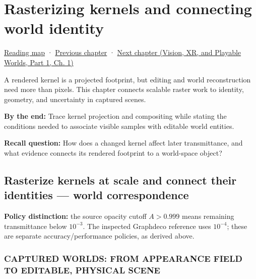 \chapter{Rasterizing kernels and connecting world identity}\label{06-engine-ii-ch045-rasterizing-kernels-and-connecting-world-identity}\hypertarget{06-engine-ii-ch045}{}\label{stagechapter:06-engine-ii-ch045}

\hypertarget{06-engine-ii-ch045-rasterizing-kernels-and-connecting-world-identity}{}

\hyperref[volume-reading-map]{Reading map} · \hyperref[06-engine-ii-ch044-cross-backend-conversion-and-agreement]{Previous chapter} · \href{../07-Vision-XR-and-Playable-Worlds-P01/main.pdf\#02-foundations-ii-ch039}{Next chapter (Vision, XR, and Playable Worlds, Part 1, Ch. 1)}

A rendered kernel is a projected footprint, but editing and world reconstruction need more than pixels. This chapter connects scalable raster work to identity, geometry, and uncertainty in captured scenes.

\textbf{By the end:} Trace kernel projection and compositing while stating the conditions needed to associate visible samples with editable world entities.

\textbf{Recall question:} How does a changed kernel affect later transmittance, and what evidence connects its rendered footprint to a world-space object?

\section{Rasterize kernels at scale and connect their identities --- world correspondence}\label{06-engine-ii-ch045-rasterize-kernels-at-scale-and-connect-their-identities-world-correspondence}

\hypertarget{06-engine-ii-ch045-rasterize-kernels-at-scale-and-connect-their-identities-world-correspondence}{}

\textbf{Policy distinction:} the source opacity cutoff \(A>0.999\) means remaining transmittance below \(10^{-3}\). The inspected Graphdeco reference uses \(10^{-4}\); these are separate accuracy/performance policies, as derived above.

\subsection{CAPTURED WORLDS: FROM APPEARANCE FIELD TO EDITABLE, PHYSICAL SCENE}\label{06-engine-ii-ch045-captured-worlds-from-appearance-field-to-editable-physical-scene}

